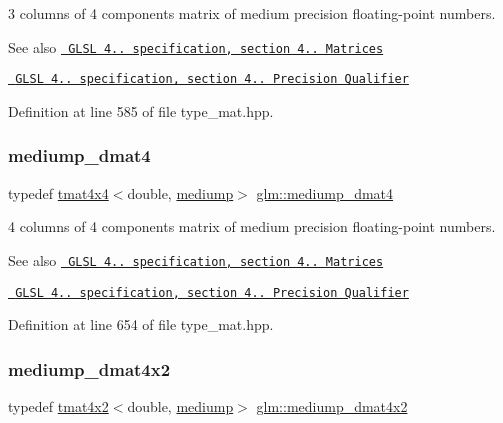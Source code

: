 3 columns of 4 components matrix of medium precision floating-\/point numbers.

\begin{DoxySeeAlso}{See also}
\href{http://www.opengl.org/registry/doc/GLSLangSpec.4.20.8.pdf}{\texttt{ G\+L\+SL 4.. specification, section 4.. Matrices}} 

\href{http://www.opengl.org/registry/doc/GLSLangSpec.4.20.8.pdf}{\texttt{ G\+L\+SL 4.. specification, section 4.. Precision Qualifier}} 
\end{DoxySeeAlso}


Definition at line 585 of file type\+\_\+mat.\+hpp.

\mbox{\label{group__core__precision_ga434a0c62564f19f260ed0520995e90f3}} 
\subsubsection{\texorpdfstring{mediump\_dmat4}{mediump\_dmat4}}
{\footnotesize\ttfamily typedef \mbox{\hyperlink{structglm_1_1tmat4x4}{tmat4x4}}$<$double, \mbox{\hyperlink{namespaceglm_a0f04f086094c747d227af4425893f545a6416f3ea0c9025fb21ed50c4d6620482}{mediump}}$>$ \mbox{\hyperlink{group__core__precision_ga434a0c62564f19f260ed0520995e90f3}{glm\+::mediump\+\_\+dmat4}}}

4 columns of 4 components matrix of medium precision floating-\/point numbers.

\begin{DoxySeeAlso}{See also}
\href{http://www.opengl.org/registry/doc/GLSLangSpec.4.20.8.pdf}{\texttt{ G\+L\+SL 4.. specification, section 4.. Matrices}} 

\href{http://www.opengl.org/registry/doc/GLSLangSpec.4.20.8.pdf}{\texttt{ G\+L\+SL 4.. specification, section 4.. Precision Qualifier}} 
\end{DoxySeeAlso}


Definition at line 654 of file type\+\_\+mat.\+hpp.

\mbox{\label{group__core__precision_gaee918464c0be014e744ff38f37c18585}} 
\subsubsection{\texorpdfstring{mediump\_dmat4x2}{mediump\_dmat4x2}}
{\footnotesize\ttfamily typedef \mbox{\hyperlink{structglm_1_1tmat4x2}{tmat4x2}}$<$double, \mbox{\hyperlink{namespaceglm_a0f04f086094c747d227af4425893f545a6416f3ea0c9025fb21ed50c4d6620482}{mediump}}$>$ \mbox{\hyperlink{group__core__precision_gaee918464c0be014e744ff38f37c18585}{glm\+::mediump\+\_\+dmat4x2}}}

